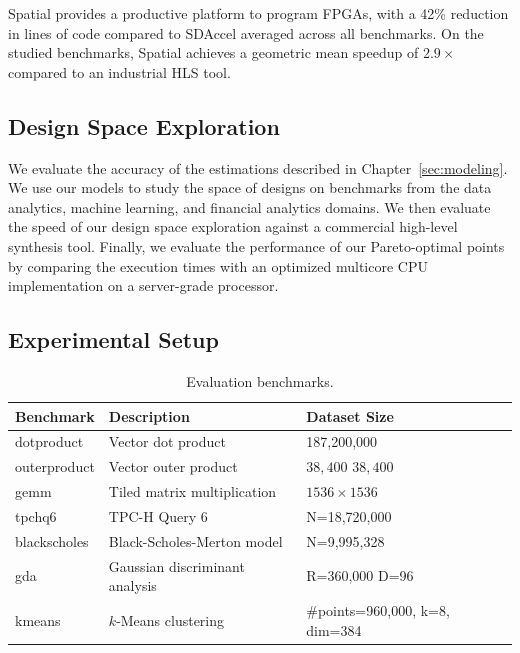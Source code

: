 Spatial provides a productive platform to program FPGAs, with a 42\% reduction in lines of code compared to SDAccel averaged across all benchmarks. On the studied benchmarks, Spatial achieves a geometric mean speedup of $2.9\times$ compared to an industrial HLS tool.


\subsection{Design Space Exploration}

We evaluate the accuracy of the estimations described in Chapter~\ref{sec:modeling}. We use our models to
study the space of designs on benchmarks from the data analytics,
machine learning, and financial analytics domains. We then evaluate the speed of our design
space exploration against a commercial high-level synthesis tool.
Finally, we evaluate the performance of our
Pareto-optimal points by comparing the execution times with an optimized multicore CPU implementation on a server-grade processor.
\subsection{Experimental Setup}

\begin{table}
\centering\footnotesize
\begin{tabular}{lm{3.6cm}m{2cm}}
\toprule

{\bf Benchmark} & {\bf Description} & {\bf Dataset Size} \\ \midrule
dotproduct   & Vector dot product & 187,200,000\\ \midrule
outerproduct & Vector outer product & $38,400$ $38,400$ \\ \midrule
gemm         & Tiled matrix multiplication & $1536 \times 1536$\\ \midrule
tpchq6       & TPC-H Query 6 & N=18,720,000 \\ \midrule
blackscholes & Black-Scholes-Merton model & N=9,995,328 \\ \midrule
gda         & Gaussian discriminant analysis & R=360,000 D=96 \\ \midrule
kmeans & $k$-Means clustering & \#points=960,000, k=8, dim=384 \\ \midrule
\end{tabular}
\caption{Evaluation benchmarks.}
\label{t:benchmarks}
\end{table}

